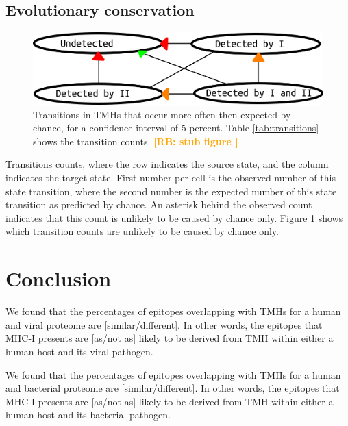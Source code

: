 \documentclass{article}
\newcommand{\richel}[1]{\textcolor{orange}{\textbf{[RB: #1]}}}
\begin{document}
\subsection{Evolutionary conservation}

\begin{figure}[!htbp]
  \includegraphics[width=\textwidth]{transitions.png}
  \caption{
    Transitions in TMHs that occur more often then expected by chance,
    for a confidence interval of 5 percent.
    Table \ref{tab:transitions} shows the transition counts.
    \richel{
      stub figure
    }
  }
  \label{fig:transitions}
\end{figure}

\begin{table}[!htbp]
  
  \caption{
    Transitions counts, where the row indicates the source state,
    and the column indicates the target state.
    First number per cell is the observed number of this state transition,
    where the second number is the expected number of this state transition
    as predicted by chance.
    An asterisk behind the observed count indicates that this count
    is unlikely to be caused by chance only.
    Figure \ref{fig:transitions} shows which transition counts are 
    unlikely to be caused by chance only.
  }
  \label{tab:transitions}
\end{table}

\section{Conclusion}

We found that the percentages of epitopes overlapping 
with TMHs for a human and viral proteome are 
[similar/different]. In other words, the
epitopes that MHC-I presents are [as/not as] likely 
to be derived from TMH within either a human host and its viral pathogen.

We found that the percentages of epitopes overlapping 
with TMHs for a human and bacterial proteome are 
[similar/different]. In other words, the
epitopes that MHC-I presents are [as/not as] likely 
to be derived from TMH within either a human host and its bacterial pathogen.
\end{document}
